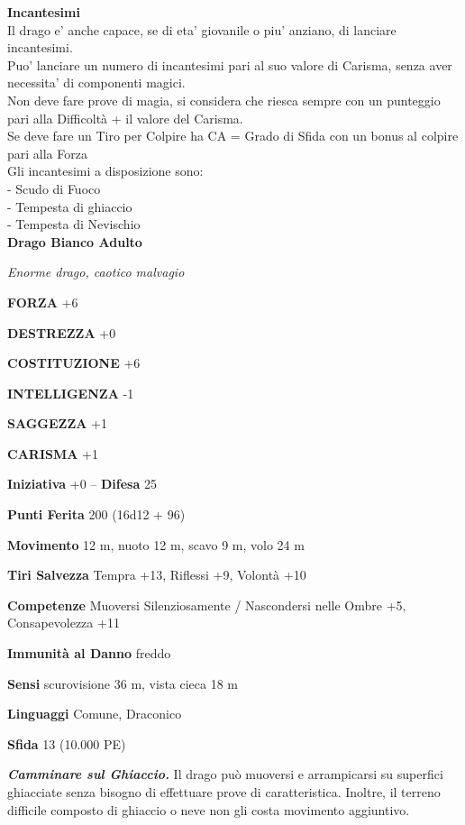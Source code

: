 \begin{multicols}{2}
\textbf{Incantesimi}\\
Il drago e' anche capace, se di eta' giovanile o piu' anziano, di lanciare incantesimi.\\
Puo' lanciare un numero di incantesimi pari al suo valore di Carisma, senza aver necessita' di componenti magici.\\
Non deve fare prove di magia, si considera che riesca sempre con un punteggio pari alla Difficoltà + il valore del Carisma.\\
Se deve fare un Tiro per Colpire ha CA = Grado di Sfida con un bonus al colpire pari alla Forza\\
Gli incantesimi a disposizione sono:\\
- Scudo di Fuoco\\
- Tempesta di ghiaccio\\
- Tempesta di Nevischio\\


\medskip{}\textbf{Drago Bianco Adulto}

\emph{Enorme drago, caotico malvagio}

\textbf{FORZA} +6

\textbf{DESTREZZA} +0

\textbf{COSTITUZIONE} +6

\textbf{INTELLIGENZA} -1

\textbf{SAGGEZZA} +1

\textbf{CARISMA} +1

\textbf{Iniziativa} +0 -- \textbf{Difesa} 25

\textbf{Punti Ferita} 200 (16d12 + 96)

\textbf{Movimento} 12 m, nuoto 12 m, scavo 9 m, volo 24 m

\textbf{Tiri Salvezza} Tempra +13, Riflessi +9, Volontà +10

\textbf{Competenze} Muoversi Silenziosamente / Nascondersi nelle Ombre +5, Consapevolezza +11

\textbf{Immunità al Danno} freddo

\textbf{Sensi} scurovisione 36 m, vista cieca 18 m

\textbf{Linguaggi} Comune, Draconico

\textbf{Sfida} 13 (10.000 PE)

\emph{\textbf{Camminare sul Ghiaccio.}} Il drago può muoversi e arrampicarsi su superfici ghiacciate senza bisogno di effettuare prove di caratteristica. Inoltre, il terreno difficile composto di ghiaccio o neve non gli costa movimento aggiuntivo.


\end{multicols}
